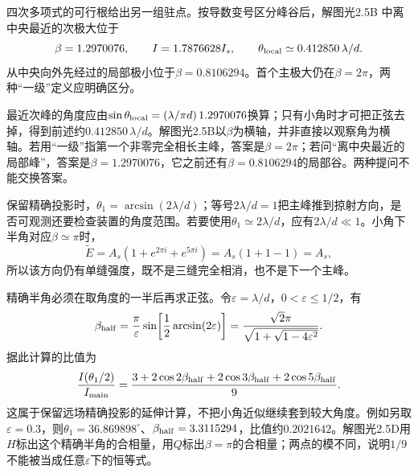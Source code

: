 \documentclass[UTF8,fontset=fandol,a4paper,11pt]{ctexart}
\newcommand{\figcaption}[1]{\par\vspace{2pt}{\small\color{muted}#1}\par}
\begin{document}
\begin{center}
\begin{minipage}{.98\linewidth}
\figcaption{解图光2.5C\quad 余弦四次多项式在物理区间内的四个根}
\end{minipage}\end{center}
四次多项式的可行根给出另一组驻点。按导数变号区分峰谷后，解图光2.5B 中离中央最近的次极大位于
\[
\beta=1.2970076,\qquad I=1.7876628I_s,
\qquad \theta_{\rm local}\simeq0.412850\,\lambda/d.
\]
从中央向外先经过的局部极小位于$\beta=0.8106294$。首个主极大仍在$\beta=2\pi$，两种“一级”定义应明确区分。


最近次峰的角度应由$\sin\theta_{\rm local}=(\lambda/\pi d)\,1.2970076$换算；只有小角时才可把正弦去掉，得到前述约$0.412850\,\lambda/d$。解图光2.5B以$\beta$为横轴，并非直接以观察角为横轴。若用“一级”指第一个非零完全相长主峰，答案是$\beta=2\pi$；若问“离中央最近的局部峰”，答案是$\beta=1.2970076$，它之前还有$\beta=0.8106294$的局部谷。两种提问不能交换答案。


保留精确投影时，$\theta_1=\arcsin(2\lambda/d)$；等号$2\lambda/d=1$把主峰推到掠射方向，是否可观测还要检查装置的角度范围。若要使用$\theta_1\simeq2\lambda/d$，应有$2\lambda/d\ll1$。小角下半角对应$\beta\simeq\pi$时，
\[
\widetilde E=A_s(1+e^{2\pi i}+e^{5\pi i})
=A_s(1+1-1)=A_s,
\]
所以该方向仍有单缝强度，既不是三缝完全相消，也不是下一个主峰。

精确半角必须在取角度的一半后再求正弦。令$\varepsilon=\lambda/d$，$0<\varepsilon\le1/2$，有
\[
\beta_{\rm half}
=\frac{\pi}{\varepsilon}\sin\!\left[\frac12\arcsin(2\varepsilon)\right]
=\frac{\sqrt2\pi}{\sqrt{1+\sqrt{1-4\varepsilon^2}}}.
\]
据此计算的比值为
\[
\frac{I(\theta_1/2)}{I_{\rm main}}
=\frac{3+2\cos2\beta_{\rm half}
+2\cos3\beta_{\rm half}+2\cos5\beta_{\rm half}}9 .
\]
这属于保留远场精确投影的延伸计算，不把小角近似继续套到较大角度。例如另取$\varepsilon=0.3$，则$\theta_1=36.869898^\circ$、$\beta_{\rm half}=3.3115294$，比值约$0.2021642$。解图光2.5D用$H$标出这个精确半角的合相量，用$Q$标出$\beta=\pi$的合相量；两点的模不同，说明$1/9$不能被当成任意$\varepsilon$下的恒等式。
\end{document}
